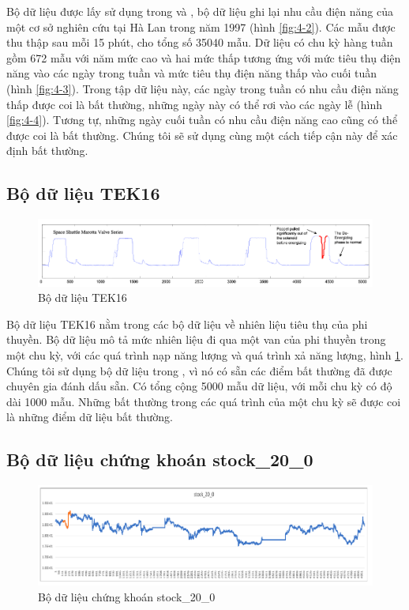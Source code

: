 Bộ dữ liệu được lấy sử dụng trong \cite{st12} \cite{st14} và \cite{st28}, bộ dữ liệu ghi lại nhu cầu điện năng của một cơ sở nghiên cứu tại Hà Lan trong năm 1997 (hình \ref{fig:4-2}). Các mẫu được thu thập sau mỗi 15 phút, cho tổng số 35040 mẫu. Dữ liệu có chu kỳ hàng tuần gồm 672 mẫu với năm mức cao và hai mức thấp tương ứng với mức tiêu thụ điện năng vào các ngày trong tuần và mức tiêu thụ điện năng thấp vào cuối tuần (hình \ref{fig:4-3}). Trong tập dữ liệu này, các ngày trong tuần có nhu cầu điện năng thấp được coi là bất thường, những ngày này có thể rơi vào các ngày lễ (hình \ref{fig:4-4}). Tương tự, những ngày cuối tuần có nhu cầu điện năng cao cũng có thể được coi là bất thường. Chúng tôi sẽ sử dụng cùng một cách tiếp cận này để xác định bất thường.

\subsection{Bộ dữ liệu TEK16}
\begin{figure}[H]
    \centering
    \includegraphics[scale=0.95]{./content/images/4-8.png}
    \caption{Bộ dữ liệu TEK16}
    \label{fig:4-8}
\end{figure}

Bộ dữ liệu TEK16 nằm trong các bộ dữ liệu về nhiên liệu tiêu thụ của phi thuyền. Bộ dữ liệu mô tả mức nhiên liệu đi qua một van của phi thuyền trong một chu kỳ, với các quá trình nạp năng lượng và quá trình xả năng lượng, hình \ref{fig:4-8}. Chúng tôi sử dụng bộ dữ liệu trong \cite{st12}, vì nó có sẵn các điểm bất thường đã được chuyên gia đánh dấu sẵn. Có tổng cộng 5000 mẫu dữ liệu, với mỗi chu kỳ có độ dài 1000 mẫu. Những bất thường trong các quá trình của một chu kỳ sẽ được coi là những điểm dữ liệu bất thường.

\subsection{Bộ dữ liệu chứng khoán stock\_20\_0}
\begin{figure}[H]
    \centering
    \includegraphics[scale=0.75]{./content/images/4-9.png}
    \caption{Bộ dữ liệu chứng khoán stock\_20\_0}
    \label{fig:4-9}
\end{figure}

